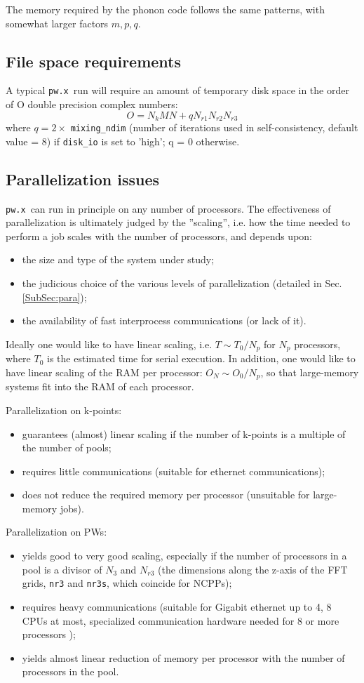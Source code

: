 \documentclass[12pt,a4paper]{article}
\def\pwx{\texttt{pw.x}}
\begin{document}
The memory required by the phonon code follows the same patterns, with
somewhat larger factors $m, p, q$.

\subsection{File space requirements}

A typical \pwx\ run will require an amount of temporary disk space in the
order of O double precision complex numbers:
$$O = N_k M N + q N_{r1} N_{r2}N_{r3}$$
where $q = 2\times$ \texttt{mixing\_ndim} (number of iterations used in 
self-consistency, default value = 8) if \texttt{disk\_io} is set to 'high'; q = 0 
otherwise.

\subsection{Parallelization issues}
\label{SubSec:badpara}

\pwx\ can run in principle on any number of processors.
The effectiveness of parallelization is ultimately judged by the 
''scaling'', i.e. how the time needed to perform a job scales
 with the number of processors, and depends upon:
\begin{itemize}
\item the size and type of the system under study;
\item the judicious choice of the various levels of parallelization 
(detailed in Sec.\ref{SubSec:para});
\item the availability of fast interprocess communications (or lack of it).
\end{itemize}
Ideally one would like to have linear scaling, i.e. $T \sim T_0/N_p$ for 
$N_p$ processors, where $T_0$ is the estimated time for serial execution.
 In addition, one would like to have linear scaling of
the RAM per processor: $O_N \sim O_0/N_p$, so that large-memory systems
fit into the RAM of each processor.

Parallelization on k-points:
\begin{itemize}
\item guarantees (almost) linear scaling if the number of k-points
is a multiple of the number of pools;
\item requires little communications (suitable for ethernet communications);
\item does not reduce the required memory per processor (unsuitable for 
large-memory jobs).
\end{itemize}
Parallelization on PWs:
\begin{itemize}
\item yields good to very good scaling, especially if the number of processors
in a pool is a divisor of $N_3$ and $N_{r3}$ (the dimensions along the z-axis 
of the FFT grids, \texttt{nr3} and \texttt{nr3s}, which coincide for NCPPs);
\item requires heavy communications (suitable for Gigabit ethernet up to 
4, 8 CPUs at most, specialized communication hardware needed for 8 or more
processors );
\item yields almost linear reduction of memory per processor with the number
of processors in the pool.
\end{itemize}
\end{document}

